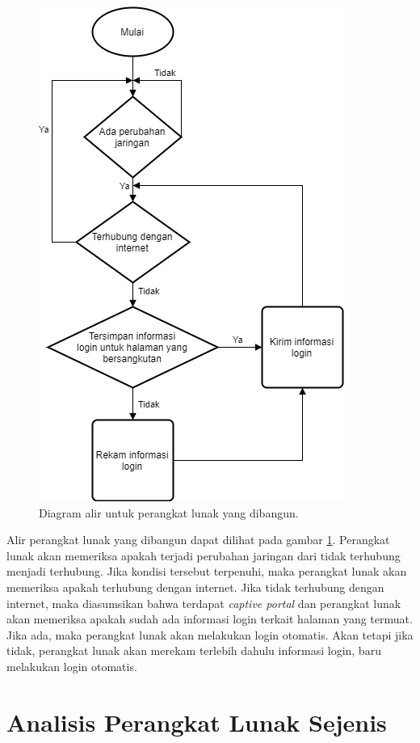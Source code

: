 \begin{figure}[h]
    \centering
    \includegraphics[scale=0.6]{Gambar/diagramalirPL.png}
    \caption[Diagram alir untuk perangkat lunak yang dibangun.]{Diagram alir untuk perangkat lunak yang dibangun.}
    \label{fig:diagramalir}
\end{figure}

Alir perangkat lunak yang dibangun dapat dilihat pada gambar \ref{fig:diagramalir}. Perangkat lunak akan memeriksa apakah terjadi perubahan jaringan dari tidak terhubung menjadi terhubung. Jika kondisi tersebut terpenuhi, maka perangkat lunak akan memeriksa apakah terhubung dengan internet. Jika tidak terhubung dengan internet, maka diasumsikan bahwa terdapat \textit{captive portal} dan perangkat lunak akan memeriksa apakah sudah ada informasi login terkait halaman yang termuat. Jika ada, maka perangkat lunak akan melakukan login otomatis. Akan tetapi jika tidak, perangkat lunak akan merekam terlebih dahulu informasi login, baru melakukan login otomatis.

\section{Analisis Perangkat Lunak Sejenis}
\label{sec:perangkat_lunak_sejenis}

